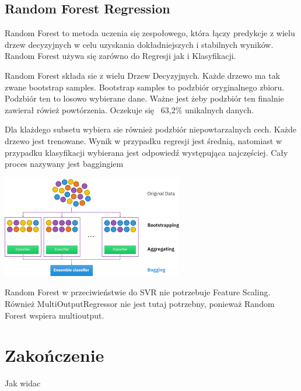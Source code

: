 \documentclass{article}
\begin{document}
\subsection{Random Forest Regression}
Random Forest to metoda uczenia się zespołowego, która łączy predykcje z wielu drzew decyzyjnych w celu uzyskania dokładniejszych i stabilnych wyników. Random Forest używa się zarówno do Regresji jak i Klasyfikacji.

Random Forest składa sie z wielu Drzew Decyzyjnych. Każde drzewo ma tak zwane bootstrap samples. Bootstrap samples to podzbiór oryginalnego zbioru. Podzbiór ten to losowo wybierane dane.
Ważne jest żeby podzbiór ten finalnie zawierał rówież powtórzenia. Oczekuje się ~63,2\% unikalnych danych. 

Dla klażdego subsetu wybiera sie również podzbiór niepowtarzalnych cech. Każde drzewo jest trenowane. Wynik w przypadku regresji jest średnią, natomiast w przypadku klasyfikacji wybierana jest odpowiedź występująca najczęściej. Cały proces nazywany jest baggingiem

 \begin{center}
    \includegraphics[scale=1]{images/bagging.png}
    \captionsetup{hypcap=false}
    \label{fig:bagging}
\end{center}




Random Forest w przeciwieństwie do SVR nie potrzebuje Feature Scaling. Również MultiOutputRegressor nie jest tutaj potrzebny, ponieważ Random Forest wspiera multioutput. 

\section{Zakończenie}

Jak widac 
\end{document}
